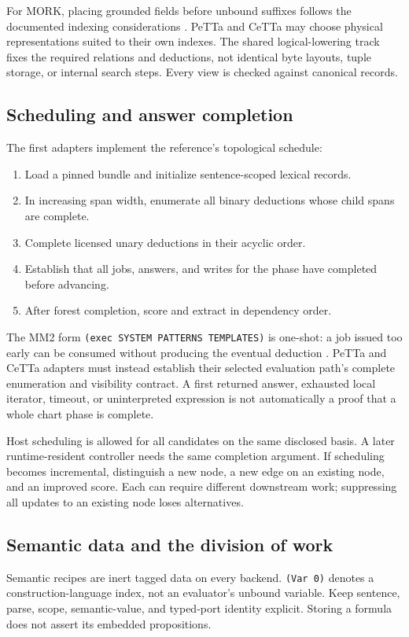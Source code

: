 \documentclass[11pt,a4paper]{article}
\newcommand{\code}[1]{\texttt{#1}}
\begin{document}
For MORK, placing grounded fields before unbound suffixes follows the
documented indexing considerations \cite{morkdata}. PeTTa and CeTTa may
choose physical representations suited to their own indexes. The shared
logical-lowering track fixes the required relations and deductions,
not identical byte layouts, tuple storage, or internal search steps.
Every view is checked against canonical records.

\subsection{Scheduling and answer completion}
The first adapters implement the reference's topological schedule:
\begin{enumerate}
  \item Load a pinned bundle and initialize sentence-scoped lexical records.
  \item In increasing span width, enumerate all binary deductions whose
  child spans are complete.
  \item Complete licensed unary deductions in their acyclic order.
  \item Establish that all jobs, answers, and writes for the phase have
  completed before advancing.
  \item After forest completion, score and extract in dependency order.
\end{enumerate}

The MM2 form \code{(exec SYSTEM PATTERNS TEMPLATES)} is one-shot:
a job issued too early can be consumed without producing the eventual
deduction \cite{morkmm2}. PeTTa and CeTTa adapters must instead establish
their selected evaluation path's complete enumeration and visibility
contract. A first returned answer, exhausted local iterator, timeout, or
uninterpreted expression is not automatically a proof that a whole chart
phase is complete.

Host scheduling is allowed for all candidates on the same disclosed basis.
A later runtime-resident controller needs the same completion argument.
If scheduling becomes incremental, distinguish a new node, a new edge on an
existing node, and an improved score. Each can require different downstream
work; suppressing all updates to an existing node loses alternatives.

\subsection{Semantic data and the division of work}
Semantic recipes are inert tagged data on every backend. \code{(Var 0)}
denotes a construction-language index, not an evaluator's unbound variable.
Keep sentence, parse, scope, semantic-value, and typed-port identity explicit.
Storing a formula does not assert its embedded propositions.
\end{document}
